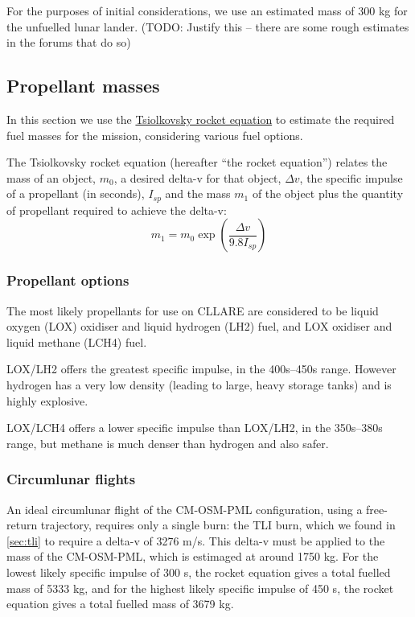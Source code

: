 \documentclass{report}
\begin{document}
For the purposes of initial considerations, we use an estimated mass of 300 kg for the unfuelled lunar lander. (TODO: Justify this -- there are some rough estimates in the forums that do so)

\subsection{Propellant masses} \label{sec:rocket_eq}

In this section we use the \href{http://en.wikipedia.org/wiki/Tsiolkovsky_rocket_equation}{Tsiolkovsky rocket equation} to estimate the required fuel masses for the mission, considering various fuel options.

The Tsiolkovsky rocket equation (hereafter ``the rocket equation'') relates the mass of an object, $m_0$, a desired delta-v for that object, $\Delta v$, the specific impulse of a propellant (in seconds), $I_{sp}$ and the mass $m_1$ of the object plus the quantity of propellant required to achieve the delta-v:
\begin{equation}
m_1 = m_0\exp \left( \frac{\Delta v}{9.8 I_{sp}} \right)
\end{equation}

\subsubsection{Propellant options}

The most likely propellants for use on CLLARE are considered to be liquid oxygen (LOX) oxidiser and liquid hydrogen (LH2) fuel, and LOX oxidiser and liquid methane (LCH4) fuel.

LOX/LH2 offers the greatest specific impulse, in the 400s--450s range.  However hydrogen has a very low density (leading to large, heavy storage tanks) and is highly explosive.

LOX/LCH4 offers a lower specific impulse than LOX/LH2, in the 350s--380s range, but methane is much denser than hydrogen and also safer.

\subsubsection{Circumlunar flights}

An ideal circumlunar flight of the CM-OSM-PML configuration, using a free-return trajectory, requires only a single burn: the TLI burn, which we found in \ref{sec:tli} to require a delta-v of 3276 m/s.  This delta-v must be applied to the mass of the CM-OSM-PML, which is estimaged at around 1750 kg.  For the lowest likely specific impulse of 300 s, the rocket equation gives a total fuelled mass of 5333 kg, and for the highest likely specific impulse of 450 s, the rocket equation gives a total fuelled mass of 3679 kg.
\end{document}
